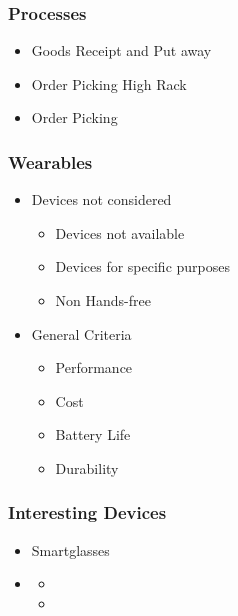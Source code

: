 \begin{frame}\frametitle{Processes}
	\begin{itemize}
		\item Goods Receipt and Put away
		\item Order Picking High Rack
		\item Order Picking \checkmark
	\end{itemize}
\end{frame}

\begin{frame}\frametitle{Wearables}
	\begin{itemize}
		\item Devices not considered
		\begin{itemize}
			\item Devices not available
			\item Devices for specific purposes
			\item Non Hands-free
		\end{itemize}
		\item General Criteria
		\begin{itemize}
			\item Performance
			\item Cost
			\item Battery Life
			\item Durability
		\end{itemize}
	\end{itemize}
\end{frame}

\begin{frame}\frametitle{Interesting Devices}
	\begin{itemize}
		\item Smartglasses
		\item[] %
		\begin{itemize}
			\item[] %
			\item[] %
		\end{itemize}
	\end{itemize}
\end{frame}

